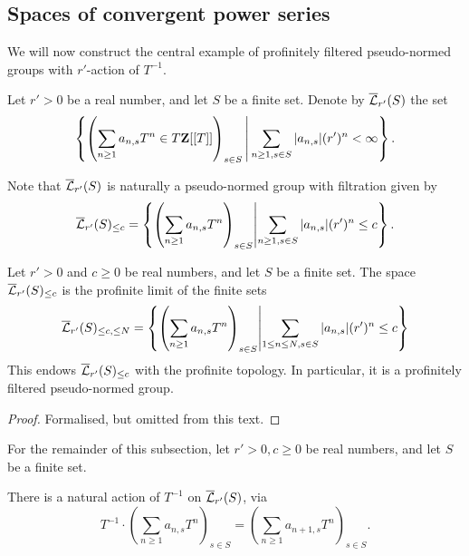 \subsection{Spaces of convergent power series}

We will now construct the central example of
profinitely filtered pseudo-normed groups with $r'$-action of $T^{-1}$.

\begin{definition}
  \label{Lbar}
  \leanok
  Let $r' > 0$ be a real number, and let $S$ be a finite set.
  Denote by $\overline{\mathcal L}_{r'}(S)$ the set
  \[
    \left\{ \left( \sum_{n \ge 1} a_{n,s} T^n \in T\mathbf{Z}[[T]]\right)_{s \in S} \,\middle\vert\, \sum_{n \ge 1, s \in S} |a_{n,s}| (r')^n < \infty \right\}.
  \]

  Note that $\overline{\mathcal L}_{r'}(S)$ is naturally a pseudo-normed group
  with filtration given by
  \[
    \overline{\mathcal L}_{r'}(S)_{\le c} =
    \left\{ \left( \sum_{n \ge 1} a_{n,s} T^n \right)_{s \in S} \middle\vert \sum_{n \ge 1, s \in S} |a_{n,s}| (r')^n \le c \right\}.
  \]
\end{definition}

\begin{lemma}
  \label{Lbar_profinitely_filtered}
  \leanok
  Let $r' > 0$ and $c \ge 0$ be real numbers, and let $S$ be a finite set.
  The space $\overline{\mathcal L}_{r'}(S)_{\le c}$ is the profinite limit of the finite sets
  \[
    \overline{\mathcal L}_{r'}(S)_{\le c, \le N} =
    \left\{ \left( \sum_{n \ge 1} a_{n,s} T^n \right)_{s \in S} \middle\vert
    \sum_{1 \le n \le N, s \in S} |a_{n,s}| (r')^n \le c \right\}
  \]
  This endows $\overline{\mathcal L}_{r'}(S)_{\le c}$ with the profinite topology.
  In particular, it is a profinitely filtered pseudo-normed group.
\end{lemma}

\begin{proof}
  \leanok
  Formalised, but omitted from this text.
\end{proof}

For the remainder of this subsection,
let $r' > 0, c \ge 0$ be real numbers,
and let $S$ be a finite set.

\begin{definition}
  \label{Lbar_Tinv}
  \leanok
  There is a natural action of $T^{-1}$ on $\overline{\mathcal L}_{r'}(S)$, via
  \[
    T^{-1} \cdot
    \left( \sum_{n \ge 1} a_{n,s} T^n \right)_{s \in S} =
    \left( \sum_{n \ge 1} a_{n+1,s} T^n \right)_{s \in S}.
  \]
\end{definition}

